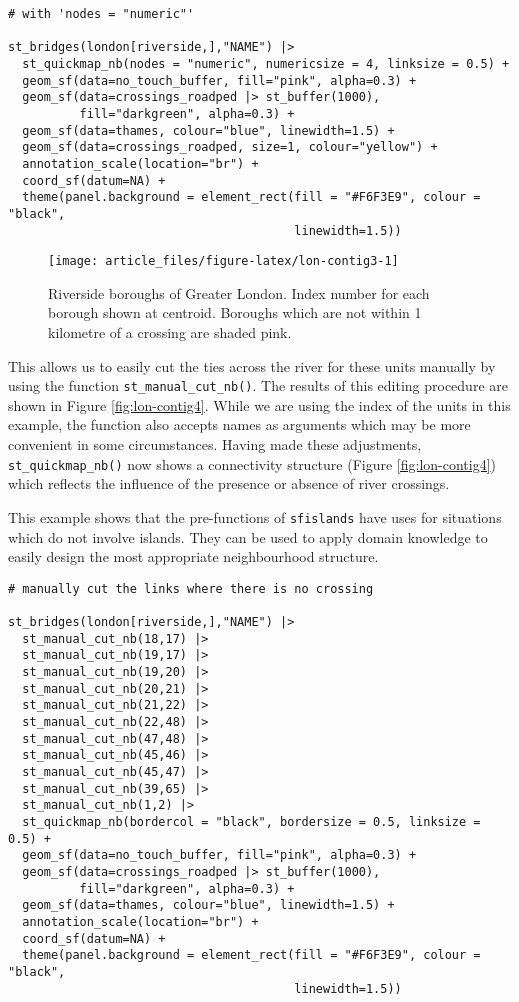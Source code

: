 \begin{verbatim}
# with 'nodes = "numeric"'

st_bridges(london[riverside,],"NAME") |> 
  st_quickmap_nb(nodes = "numeric", numericsize = 4, linksize = 0.5) +
  geom_sf(data=no_touch_buffer, fill="pink", alpha=0.3) + 
  geom_sf(data=crossings_roadped |> st_buffer(1000), 
          fill="darkgreen", alpha=0.3) +
  geom_sf(data=thames, colour="blue", linewidth=1.5) + 
  geom_sf(data=crossings_roadped, size=1, colour="yellow") + 
  annotation_scale(location="br") +
  coord_sf(datum=NA) + 
  theme(panel.background = element_rect(fill = "#F6F3E9", colour = "black", 
                                        linewidth=1.5))
\end{verbatim}

\begin{figure}

{\centering \texttt{[image: article\_files/figure-latex/lon-contig3-1]} 

}

\caption{Riverside boroughs of Greater London. Index number for each borough shown at centroid. Boroughs which are not within 1 kilometre of a crossing are shaded pink. }\label{fig:lon-contig3}
\end{figure}

This allows us to easily cut the ties across the river for these units
manually by using the function \texttt{st\_manual\_cut\_nb()}. The results of this editing procedure are shown in Figure \ref{fig:lon-contig4}.
While we are using the index of the units in this example, the function also
accepts names as arguments which may be more convenient in some circumstances. Having made these adjustments,
\texttt{st\_quickmap\_nb()} now shows a connectivity structure (Figure \ref{fig:lon-contig4}) which reflects the influence of the
presence or absence of river crossings.

This example shows that the pre-functions of \texttt{sfislands} have uses for situations which do not involve islands. They can be used to apply domain knowledge to easily design the most appropriate neighbourhood structure.

\begin{verbatim}
# manually cut the links where there is no crossing

st_bridges(london[riverside,],"NAME") |> 
  st_manual_cut_nb(18,17) |> 
  st_manual_cut_nb(19,17) |> 
  st_manual_cut_nb(19,20) |> 
  st_manual_cut_nb(20,21) |> 
  st_manual_cut_nb(21,22) |> 
  st_manual_cut_nb(22,48) |> 
  st_manual_cut_nb(47,48) |> 
  st_manual_cut_nb(45,46) |> 
  st_manual_cut_nb(45,47) |>  
  st_manual_cut_nb(39,65) |> 
  st_manual_cut_nb(1,2) |> 
  st_quickmap_nb(bordercol = "black", bordersize = 0.5, linksize = 0.5) +
  geom_sf(data=no_touch_buffer, fill="pink", alpha=0.3) + 
  geom_sf(data=crossings_roadped |> st_buffer(1000), 
          fill="darkgreen", alpha=0.3) +
  geom_sf(data=thames, colour="blue", linewidth=1.5) +
  annotation_scale(location="br") +
  coord_sf(datum=NA) + 
  theme(panel.background = element_rect(fill = "#F6F3E9", colour = "black", 
                                        linewidth=1.5))
\end{verbatim}

